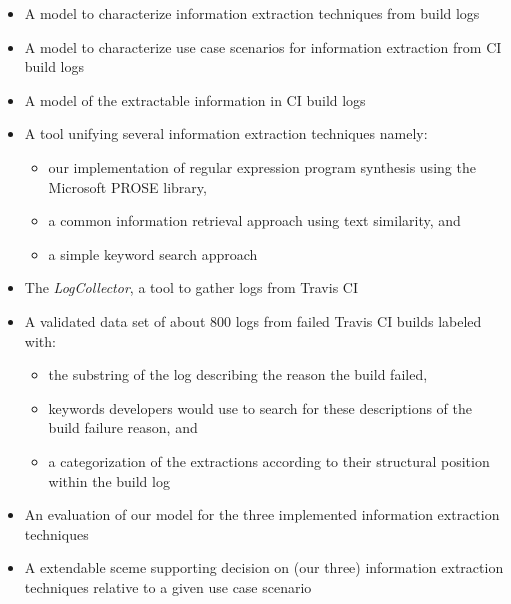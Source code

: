 \documentclass[\myrootdir/main.tex]{subfiles}
\begin{document}
\begin{itemize}
  \item A model to characterize information extraction techniques from  build logs
  \item A model to characterize use case scenarios for information extraction from CI build logs
  \item A model of the extractable information in CI build logs
  \item A tool unifying several information extraction techniques namely:
        \begin{itemize}
          \item our implementation of regular expression program synthesis using the Microsoft PROSE library,
          \item a common information retrieval approach using text similarity, and
          \item a simple keyword search approach
        \end{itemize}
  \item The \emph{LogCollector}, a tool to gather logs from Travis CI
  \item A validated data set of about 800 logs from failed Travis CI builds labeled with:
        \begin{itemize}
          \item the substring of the log describing the reason the build failed,
          \item keywords developers would use to search for these descriptions of the build failure reason, and
          \item a categorization of the extractions according to their structural position within the build log
        \end{itemize}
  \item An evaluation of our model for the three implemented information extraction techniques 
  \item A extendable sceme supporting decision on (our three) information extraction techniques relative to a given use case scenario
\end{itemize}

\end{document}
